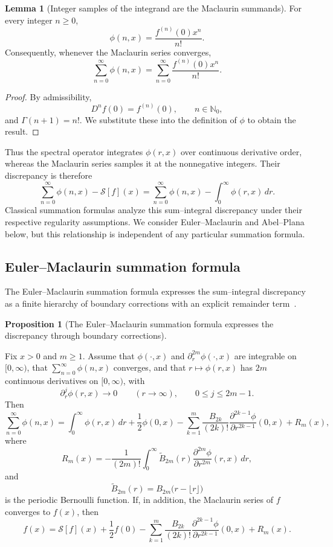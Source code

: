 \documentclass[preprint, 12pt]{elsarticle}
\theoremstyle{definition}
\newtheorem{lemma}[definition]{Lemma}
\newtheorem{proposition}[definition]{Proposition}
\theoremstyle{plain}
\theoremstyle{remark}
\begin{document}
\begin{lemma}[Integer samples of the integrand are the Maclaurin summands]
\label{lem:integer_sampling}
For every integer $n\geq 0$,
\[
\phi(n,x)
=
\frac{f^{(n)}(0)x^n}{n!}.
\]
Consequently, whenever the Maclaurin series converges,
\[
\sum_{n=0}^\infty \phi(n,x)
=
\sum_{n=0}^\infty
\frac{f^{(n)}(0)x^n}{n!}.
\]
\end{lemma}

\begin{proof}
By admissibility,
\[
D^n f(0)=f^{(n)}(0),
\qquad n\in\mathbb N_0,
\]
and $\Gamma(n+1)=n!$. We substitute these into the definition of $\phi$ to obtain the result.
\end{proof}

Thus the spectral operator integrates $\phi(r,x)$ over continuous derivative order, whereas the Maclaurin series samples it at the nonnegative integers. Their discrepancy is therefore
\[
\sum_{n=0}^\infty \phi(n,x)
-
\mathcal S[f](x)
=
\sum_{n=0}^\infty \phi(n,x)
-
\int_0^\infty \phi(r,x)\,dr.
\]
Classical summation formulas analyze this sum--integral discrepancy under their respective regularity assumptions. We consider Euler--Maclaurin and Abel--Plana below, but this relationship is independent of any particular summation formula.

\subsection{Euler--Maclaurin summation formula}
The Euler--Maclaurin summation formula expresses the sum--integral discrepancy as a finite hierarchy of boundary corrections with an explicit remainder term~\cite[\S 2.10(i)]{NIST:DLMF}.

\begin{proposition}[The Euler--Maclaurin summation formula expresses the discrepancy through boundary corrections]
\label{prop:sum_integral_discrepancy}

Fix $x>0$ and $m\geq1$. Assume that $\phi(\cdot,x)$ and $\partial_r^{2m}\phi(\cdot,x)$ are integrable on $[0,\infty)$, that $\sum_{n=0}^{\infty}\phi(n,x)$ converges, and that $r\mapsto\phi(r,x)$ has $2m$ continuous derivatives on $[0,\infty)$, with
\[
\partial_r^j\phi(r,x)\longrightarrow 0
\qquad
(r\to\infty),
\qquad
0\leq j\leq 2m-1.
\]
Then
\[
\sum_{n=0}^{\infty}\phi(n,x)
=
\int_0^\infty \phi(r,x)\,dr
+
\frac12\phi(0,x)
-
\sum_{k=1}^{m}
\frac{B_{2k}}{(2k)!}
\frac{\partial^{2k-1}\phi}{\partial r^{2k-1}}(0,x)
+
R_m(x),
\]
where
\[
R_m(x)
=
-\frac{1}{(2m)!}
\int_0^\infty
\widetilde B_{2m}(r)
\frac{\partial^{2m}\phi}{\partial r^{2m}}(r,x)
\,dr,
\]
and
\[
\widetilde B_{2m}(r)
=
B_{2m}\bigl(r-\lfloor r\rfloor\bigr)
\]
is the periodic Bernoulli function. If, in addition, the Maclaurin series of $f$ converges to $f(x)$, then
\[
f(x)
=
\mathcal S[f](x)
+
\frac12 f(0)
-
\sum_{k=1}^{m}
\frac{B_{2k}}{(2k)!}
\frac{\partial^{2k-1}\phi}{\partial r^{2k-1}}(0,x)
+
R_m(x).
\]
\end{proposition}
\end{document}
